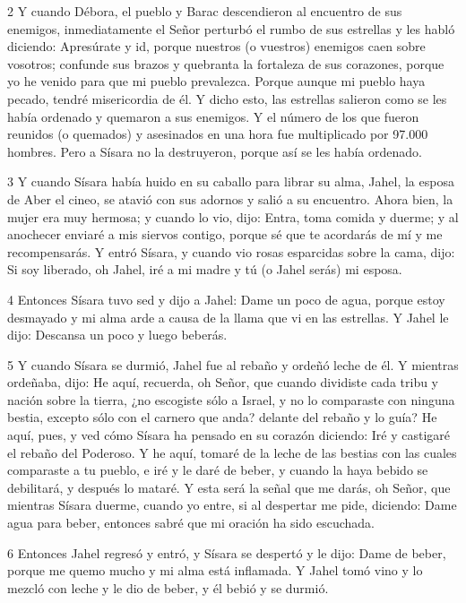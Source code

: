 \par 2 Y cuando Débora, el pueblo y Barac descendieron al encuentro de sus enemigos, inmediatamente el Señor perturbó el rumbo de sus estrellas y les habló diciendo: Apresúrate y id, porque nuestros (o vuestros) enemigos caen sobre vosotros; confunde sus brazos y quebranta la fortaleza de sus corazones, porque yo he venido para que mi pueblo prevalezca. Porque aunque mi pueblo haya pecado, tendré misericordia de él. Y dicho esto, las estrellas salieron como se les había ordenado y quemaron a sus enemigos. Y el número de los que fueron reunidos (o quemados) y asesinados en una hora fue multiplicado por 97.000 hombres. Pero a Sísara no la destruyeron, porque así se les había ordenado.

\par 3 Y cuando Sísara había huido en su caballo para librar su alma, Jahel, la esposa de Aber el cineo, se atavió con sus adornos y salió a su encuentro. Ahora bien, la mujer era muy hermosa; y cuando lo vio, dijo: Entra, toma comida y duerme; y al anochecer enviaré a mis siervos contigo, porque sé que te acordarás de mí y me recompensarás. Y entró Sísara, y cuando vio rosas esparcidas sobre la cama, dijo: Si soy liberado, oh Jahel, iré a mi madre y tú (o Jahel serás) mi esposa.

\par 4 Entonces Sísara tuvo sed y dijo a Jahel: Dame un poco de agua, porque estoy desmayado y mi alma arde a causa de la llama que vi en las estrellas. Y Jahel le dijo: Descansa un poco y luego beberás.

\par 5 Y cuando Sísara se durmió, Jahel fue al rebaño y ordeñó leche de él. Y mientras ordeñaba, dijo: He aquí, recuerda, oh Señor, que cuando dividiste cada tribu y nación sobre la tierra, ¿no escogiste sólo a Israel, y no lo comparaste con ninguna bestia, excepto sólo con el carnero que anda? delante del rebaño y lo guía? He aquí, pues, y ved cómo Sísara ha pensado en su corazón diciendo: Iré y castigaré el rebaño del Poderoso. Y he aquí, tomaré de la leche de las bestias con las cuales comparaste a tu pueblo, e iré y le daré de beber, y cuando la haya bebido se debilitará, y después lo mataré. Y esta será la señal que me darás, oh Señor, que mientras Sísara duerme, cuando yo entre, si al despertar me pide, diciendo: Dame agua para beber, entonces sabré que mi oración ha sido escuchada.

\par 6 Entonces Jahel regresó y entró, y Sísara se despertó y le dijo: Dame de beber, porque me quemo mucho y mi alma está inflamada. Y Jahel tomó vino y lo mezcló con leche y le dio de beber, y él bebió y se durmió.


